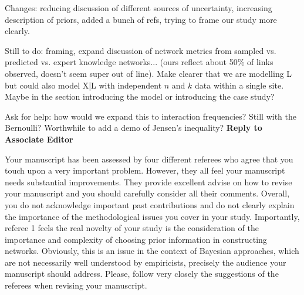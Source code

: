 \documentclass[12pt]{letter}
\newenvironment{refquote}{\bigskip \begin{it}}{\end{it}\smallskip}
\begin{document}
\newpage

\setcounter{page}{1}


Changes: reducing discussion of different sources of uncertainty, increasing description of priors, added a bunch of refs, trying to frame our study more clearly.

Still to do: framing, expand discussion of network metrics from sampled vs. predicted vs. expert knowledge networks... (ours reflect about 50\% of links observed, doesn't seem super out of line). Make clearer that we are modelling L but could also model X|L with independent $n$ and $k$ data within a single site. Maybe in the section introducing the model or introducing the case study?

Ask for help: how would we expand this to interaction frequencies? Still with the Bernoulli? Worthwhile to add a demo of Jensen's inequality?
{\Large \bf Reply to Associate Editor}


	\begin{refquote}
	Your manuscript has been assessed by four different referees who agree that you touch upon a very important problem. However, they all feel your manuscript needs substantial improvements. They provide excellent advise on how to revise your manuscript and you should carefully consider all their comments. Overall, you do not acknowledge important past contributions and do not clearly explain the importance of the methodological issues you cover in your study. Importantly, referee 1 feels the real novelty of your study is the consideration of the importance and complexity of choosing prior information in constructing networks. Obviously, this is an issue in the context of Bayesian approaches, which are not necessarily well understood by empiricists, precisely the audience your manuscript should address. Please, follow very closely the suggestions of the referees when revising your manuscript.

	\end{refquote}
\end{document}
